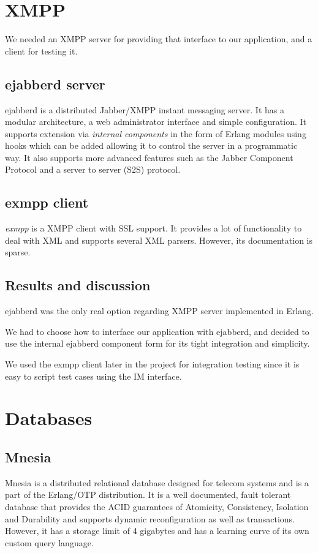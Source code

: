 \documentclass[11pt,a4paper]{report}
\begin{document}
\section{XMPP}
We needed an XMPP server for providing that interface to our application, and a
client for testing it.

\subsection{ejabberd server}
ejabberd is a distributed Jabber/XMPP instant messaging server. It has a modular
architecture, a web administrator interface and simple configuration. It
supports extension via \emph{internal components} in the form of Erlang modules
using hooks which can be added allowing it to control the server in a
programmatic way\cite{ejabberd-plugin}. It also supports more advanced features
such as the Jabber Component Protocol \cite{xmpp-component} and a server to
server (S2S) protocol\cite{xmpp-s2s}.

\subsection{exmpp client}
\emph{exmpp} is a XMPP client with SSL support. It provides a lot of functionality to
deal with XML and supports several XML parsers. However, its documentation is
sparse.

\subsection{Results and discussion}
ejabberd was the only real option regarding XMPP server implemented in Erlang.

We had to choose how to interface our application with ejabberd, and decided
to use the internal ejabberd component form for its tight integration and
simplicity.

We used the exmpp client later in the project for integration
testing since it is easy to script test cases using the IM interface.

\section{Databases}
\subsection{Mnesia}
Mnesia is a distributed relational database designed for telecom systems and is
a part of the Erlang/OTP distribution. It is a well documented, fault tolerant
database that provides the ACID\cite{ACID} guarantees of Atomicity, Consistency,
Isolation and Durability and supports dynamic reconfiguration as well
as transactions. However, it has a storage limit of 4 gigabytes and has a
learning curve of its own custom query language.
\end{document}
